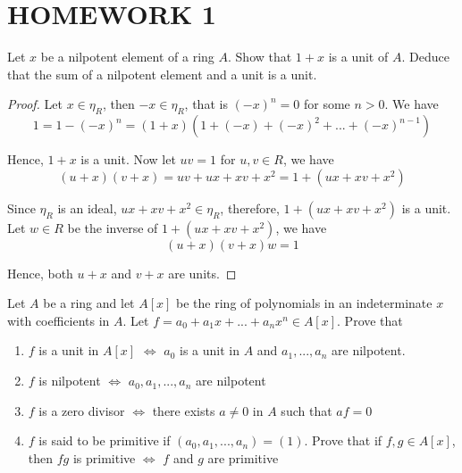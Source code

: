 \chapter{HOMEWORK 1}

\begin{problem}
	Let $x$ be a nilpotent element of a ring $A$. Show that $1 + x$ is a unit of $A$. Deduce that the sum of a nilpotent element and a unit is a unit.
\end{problem}

\begin{proof}
	Let $x \in \eta_R$, then $-x \in \eta_R$, that is $(-x)^n = 0$ for some $n > 0$. We have
	$$
		1 = 1 - (-x)^n = (1 + x)(1 + (-x) + (-x)^2 + ... + (-x)^{n-1})
	$$
	
	Hence, $1 + x$ is a unit. Now let $uv = 1$ for $u, v \in R$, we have
	$$
		(u + x)(v + x) = uv + ux + xv + x^2 = 1 + (ux + xv + x^2)
	$$
	
	Since $\eta_R$ is an ideal, $ux + xv + x^2 \in \eta_R$, therefore, $1 + (ux + xv + x^2)$ is a unit. Let $w \in R$ be the inverse of $1 + (ux + xv + x^2)$, we have
	$$
		(u + x)(v + x) w = 1
	$$
	
	Hence, both $u + x$ and $v + x$ are units.
\end{proof}

\begin{problem}
	Let $A$ be a ring and let $A[x]$ be the ring of polynomials in an indeterminate $x$ with coefficients in $A$. Let $f = a_0 + a_1 x + ... + a_n x^n \in A[x]$. Prove that
	\begin{enumerate}
		\item $f$ is a unit in $A[x]$ $\iff$ $a_0$ is a unit in $A$ and $a_1, ..., a_n$ are nilpotent.
		\item $f$ is nilpotent $\iff$ $a_0, a_1, ..., a_n$ are nilpotent
		\item $f$ is a zero divisor $\iff$ there exists $a \neq 0$ in $A$ such that $af = 0$
		\item $f$ is said to be primitive if $(a_0, a_1, ..., a_n) = (1)$. Prove that if $f, g \in A[x]$, then $fg$ is primitive $\iff$ $f$ and $g$ are primitive
	\end{enumerate}
\end{problem}

